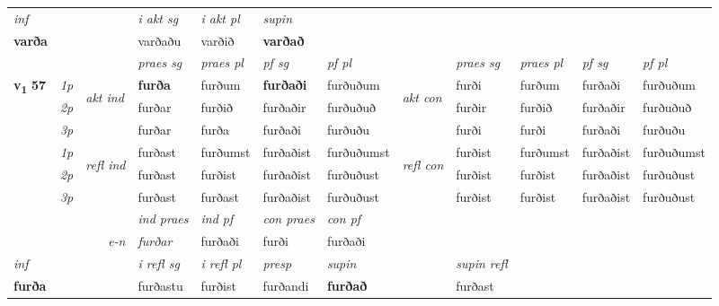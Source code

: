 \begin{longtable}[l]{X>{\footnotesize\itshape}llXXXXlXXXX}
   {\textit{inf}} & &  & \textit{i akt sg} & \textit{i akt pl}    & \textit{supin}   \\*
  {\textbf{varða}} & && varðaðu  & varðið    &  \textbf{varðað}   \\*

\midrule

 & &   & \textit{praes sg}  & \textit{praes pl}    & \textit{ pf sg} & \textit{pf pl} & & \textit{praes sg}  & \textit{praes pl}    & \textit{pf sg} & \textit{pf pl }  \\ \cmidrule{4-7} \cmidrule{9-12}
 \multirow{2}{*}{{{\textbf{v{\textsubscript{1}}} \Large{\textbf{57}}}}}  & 1p & \multirow{3}{*}{\begin{turn}{90}\textit{akt ind}\end{turn}} & \textbf{furða} & furðum & \textbf{furðaði} & furðuðum & \multirow{3}{*}{\begin{turn}{90}\textit{akt con}\end{turn}} &furði & furðum & furðaði & furðuðum\\*
 & 2p &  &  furðar  & furðið & furðaðir & furðuðuð & & furðir & furðið & furðaðir & furðuðuð \\*
 & 3p &  & furðar & furða & furðaði & furðuðu & & furði & furði& furðaði & furðuðu \\*
\cmidrule{4-7} \cmidrule{9-12}
 & 1p & \multirow{3}{*}{\begin{turn}{90}\textit{refl ind}\end{turn}}  & furðast & furðumst & furðaðist & furðuðumst & \multirow{3}{*}{\begin{turn}{90}\textit{refl con}\end{turn}}  &furðist & furðumst & furðaðist & furðuðumst \\*
 & 2p &  & furðast & furðist & furðaðist & furðuðust & &furðist & furðist & furðaðist & furðuðust \\*
 & 3p  & & furðast & furðast & furðaðist & furðuðust & & furðist & furðist& furðaðist & furðuðust \\*
\cmidrule{4-7} \cmidrule{9-12}

   && &  \textit{ind praes} & \textit{ind pf} & \textit{con praes} & \textit{con pf} \\*
\multicolumn{3}{r}{\textit{e-n}} & furðar & furðaði & furði & furðaði \\*

\cmidrule{4-7}
   {\textit{inf}} & &   & \textit{i refl sg} & \textit{i refl pl} & \textit{presp} & \textit{supin} && \textit{supin refl}  \\*
  {\textbf{furða}} & &   & furðastu & furðist & furðandi &  \textbf{furðað} && furðast  \\*


\end{longtable}
